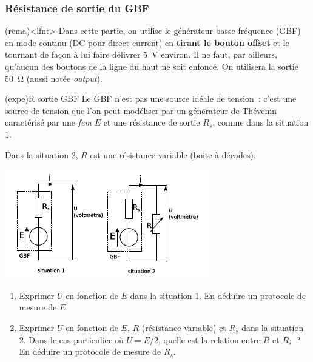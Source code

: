 \documentclass[../main/main.tex]{subfiles}
\begin{document}
\subsubsection{Résistance de sortie du GBF}

\begin{tcb}(rema)<lfnt>{}
	Dans cette partie, on utilise le générateur basse fréquence (GBF) en mode
	continu (DC pour direct current) en \textbf{tirant le bouton offset} et le
	tournant de façon à lui faire délivrer \SI{5}{V} environ. Il ne faut, par
	ailleurs, qu'aucun des boutons de la ligne du haut ne soit enfoncé. On utilisera
	la sortie \SI{50}{\ohm} (aussi notée \textit{output}).
\end{tcb}

\begin{tcb}[sidebyside, righthand ratio=0.45](expe){R sortie GBF}
	Le GBF n'est pas une source idéale de tension~: c'est une source de tension que
	l'on peut modéliser par un générateur de Thévenin caractérisé par une
	\textit{fem} $E$ et une résistance de sortie $R_s$, comme dans la situation 1.

	Dans la situation 2, $R$ est une résistance variable (boite à décades).
	\tcblower
	\begin{center}
		\includegraphics[width=\linewidth]{gbf}
	\end{center}
\end{tcb}

\begin{enumerate}[label=\clenumi]
	\item Exprimer $U$ en fonction de $E$ dans la situation 1. En déduire un
	      protocole de mesure de $E$.
	\item Exprimer $U$ en fonction de $E$, $R$ (résistance variable) et $R_s$
	      dans la situation 2. Dans le cas particulier où $U=E/2$, quelle est la
	      relation entre  $R$ et $R_s$~? En déduire un protocole de mesure de
	      $R_s$.
\end{enumerate}
\end{document}
